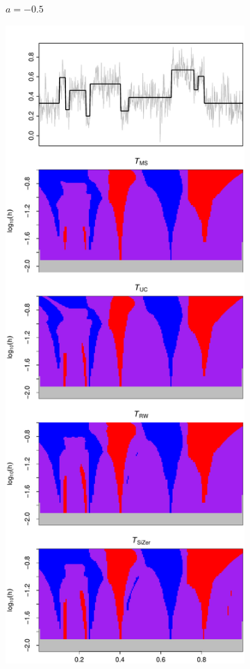 \begin{figure}[p]
\begin{subfigure}[b]{0.475\textwidth}
\caption{$a=-0.5$}
\end{subfigure}
\hspace{0.25cm}
\begin{subfigure}[b]{0.475\textwidth}
\includegraphics[width=\textwidth]{Plots/SiZermaps/SiZer_map_T_1000_blocks_a1_50_seed_6.pdf}

\end{subfigure}
\end{figure}
